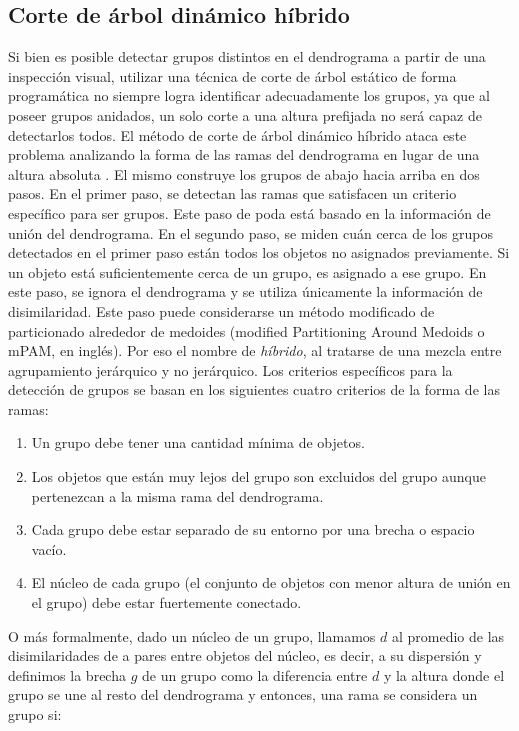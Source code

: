 \subsection{Corte de árbol dinámico híbrido}
Si bien es posible detectar grupos distintos en el dendrograma a partir de una inspección visual, utilizar una técnica de corte de árbol estático de forma programática no siempre logra identificar adecuadamente los grupos, ya que al poseer grupos anidados, un solo corte a una altura prefijada no será capaz de detectarlos todos. El método de corte de árbol dinámico híbrido ataca este problema analizando la forma de las ramas del dendrograma en lugar de una altura absoluta \cite{Langfelder2008}. El mismo construye los grupos de abajo hacia arriba en dos pasos. En el primer paso, se detectan las ramas que satisfacen un criterio específico para ser grupos. Este paso de poda está basado en la información de unión del dendrograma. En el segundo paso, se miden cuán cerca de los grupos detectados en el primer paso están todos los objetos no asignados previamente. Si un objeto está suficientemente cerca de un grupo, es asignado a ese grupo. En este paso, se ignora el dendrograma y se utiliza únicamente la información de disimilaridad. Este paso puede considerarse un método modificado de particionado alrededor de medoides (modified Partitioning Around Medoids o mPAM, en inglés). Por eso el nombre de \textit{híbrido}, al tratarse de una mezcla entre agrupamiento jerárquico y no jerárquico.
Los criterios específicos para la detección de grupos se basan en los siguientes cuatro criterios de la forma de las ramas:
\begin{enumerate}
\item Un grupo debe tener una cantidad mínima de objetos.
\item Los objetos que están muy lejos del grupo son excluidos del grupo aunque pertenezcan a la misma rama del dendrograma.
\item Cada grupo debe estar separado de su entorno por una brecha o espacio vacío.
\item El núcleo de cada grupo (el conjunto de objetos con menor altura de unión en el grupo) debe estar fuertemente conectado.
\end{enumerate}
O más formalmente, dado un núcleo de un grupo, llamamos $d$ al promedio de las disimilaridades de a pares entre objetos del núcleo, es decir, a su dispersión y definimos la brecha $g$ de un grupo como la diferencia entre $d$ y la altura donde el grupo se une al resto del dendrograma y entonces, una rama se considera un grupo si:
